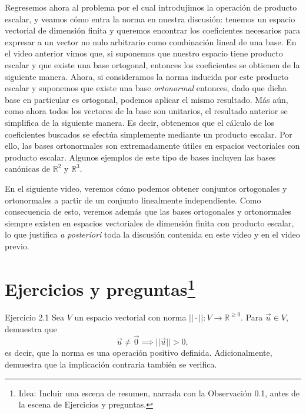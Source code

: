 \documentclass[12pt,dvipsnames]{article}
\numberwithin{equation}{section}
\begin{document}
Regresemos ahora al problema por el cual introdujimos la operación de producto escalar, y veamos cómo entra la norma en nuestra discusión: tenemos un espacio vectorial de dimensión finita y queremos encontrar los coeficientes necesarios para expresar a un vector no nulo arbitrario como combinación lineal de una base. En el video anterior vimos que, si suponemos que nuestro espacio tiene producto escalar y que existe una base ortogonal, entonces los coeficientes se obtienen de la siguiente manera. Ahora, si consideramos la norma inducida por este producto escalar y suponemos que existe una base \emph{ortonormal} entonces, dado que dicha base en particular es ortogonal, podemos aplicar el mismo resultado. Más aún, como ahora todos los vectores de la base son unitarios, el resultado anterior se simplifica de la siguiente manera. Es decir, obtenemos que el cálculo de los coeficientes buscados se efectúa simplemente mediante un producto escalar. Por ello, las bases ortonormales son extremadamente útiles en espacios vectoriales con producto escalar. Algunos ejemplos de este tipo de bases incluyen las bases canónicas de $\mathbb{R}^2$ y $\mathbb{R}^3$. 

En el siguiente video, veremos cómo podemos obtener conjuntos ortogonales y ortonormales a partir de un conjunto linealmente independiente. Como consecuencia de esto, veremos además que las bases ortogonales y ortonormales siempre existen en espacios vectoriales de dimensión finita con producto escalar, lo que justifica \emph{a posteriori} toda la discusión contenida en este video y en el video previo.


\newpage
\section{Ejercicios y preguntas\footnote{Idea: Incluir una escena de resumen, narrada con la Observación 0.1, antes de la escena de Ejercicios y preguntas.}}


Ejercicio 2.1 Sea $V$ un espacio vectorial con norma $||\cdot||:V\to \mathbb{R}^{\geq0}$. Para $\vec{u}\in V$, demuestra que \[
    \vec{u} \neq \vec{0} \implies ||\vec{u}|| > 0,
\] 
es decir, que la norma es una operación positivo definida. Adicionalmente, demuestra que la implicación contraria también se verifica. \\
\end{document}
